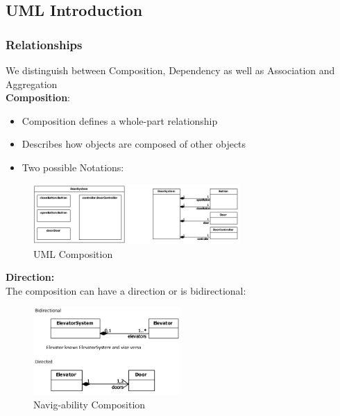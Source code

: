 \hypertarget{uml-introduction}{%
\subsection{UML Introduction}\label{uml-introduction}}

\hypertarget{relationships}{%
\subsubsection{Relationships}\label{relationships}}

We distinguish between Composition, Dependency as well as Association
and Aggregation\\

\textbf{Composition}:\\
\begin{itemize}
    \item Composition defines a whole-part relationship
    \item Describes how objects are composed of other objects
    \item Two possible Notations:
\end{itemize}

\begin{figure}[H]
\centering
\includegraphics[width=0.7\textwidth]{figures/compositionUml.png}
\caption{UML Composition}
\end{figure}

\textbf{Direction:}\\
The composition can have a direction or is bidirectional:

\begin{figure}[H]
\centering
\includegraphics[width=0.5\textwidth]{figures/directionCompositionUml.png}
\caption{Navig-ability Composition}
\end{figure}

